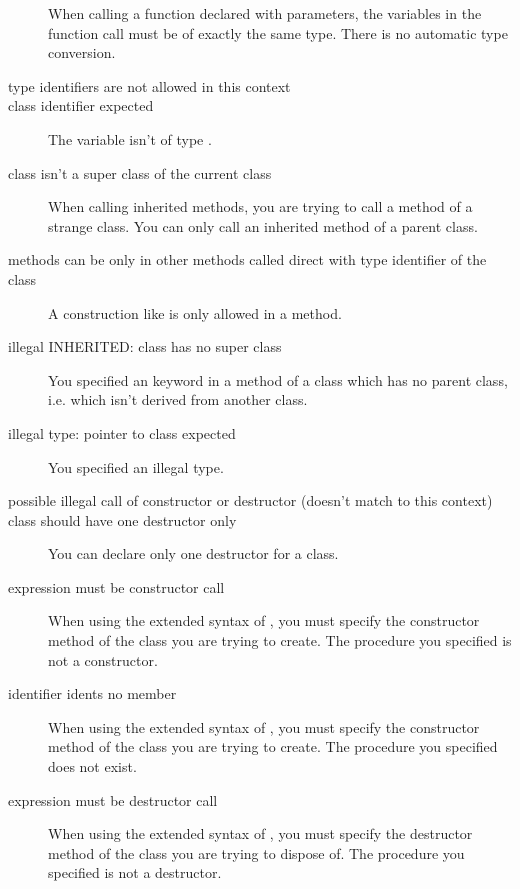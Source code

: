 \documentclass{report}
\begin{document}
\begin{description}
When calling a function declared with  parameters, the variables in
the function call must be of exactly the same type. There is no automatic
type conversion. 
\item [type identifiers are not allowed in this context]
\item [class identifier expected]
The variable isn't of type .
\item [class isn't a super class of the current class]
When calling inherited methods, you are trying to call a method of a strange
class. You can only call an inherited method of a parent class.
\item [methods can be only in other methods called direct with type identifier of the class]
A construction like  is only allowed in a method.
\item [illegal INHERITED: class has no super class]
You specified an  keyword in a method of a class which has no
parent class, i.e. which isn't derived from another class.
\item [illegal type: pointer to class expected]
You specified an illegal type.
\item [possible illegal call of constructor or destructor (doesn't match to this context)]
\item [class should have one destructor only]
You can declare only one destructor for a class.
\item [expression must be constructor call]
When using the extended syntax of , you must specify the constructor
method of the class you are trying to create. The procedure you specified
is not a constructor.
\item [identifier idents no member]
When using the extended syntax of , you must specify the constructor
method of the class you are trying to create. The procedure you specified
does not exist.
\item [expression must be destructor call]
When using the extended syntax of , you must specify the
destructor method of the class you are trying to dispose of. 
The procedure you specified is not a destructor.


\end{description}
\end{document}
